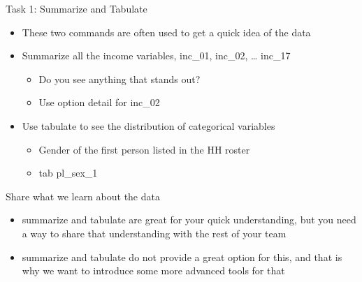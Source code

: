 \documentclass[aspectratio=169]{beamer}
\begin{document}
\begin{frame}{Task 1: Summarize and Tabulate}
\begin{itemize}
	\item These two commands are often used to get a quick idea of the data
	\item Summarize all the income variables, inc\_01, inc\_02, … inc\_17
		\begin{itemize}
			\item Do you see anything that stands out?
			\item Use option detail for inc\_02
		\end{itemize}
	\item Use tabulate to see the distribution of categorical variables
		\begin{itemize}
			\item Gender of the first person listed in the HH roster
			\item tab pl\_sex\_1
		\end{itemize}
\end{itemize}
\end{frame}

\begin{frame}{Share what we learn about the data }
\begin{itemize}
	\item summarize and tabulate are great for your quick understanding, but you need a way to share that understanding with the rest of your team
	\item summarize and tabulate do not provide a great option for this, and that is why we want to introduce some more advanced tools for that
\end{itemize}
\end{frame}
\end{document}
